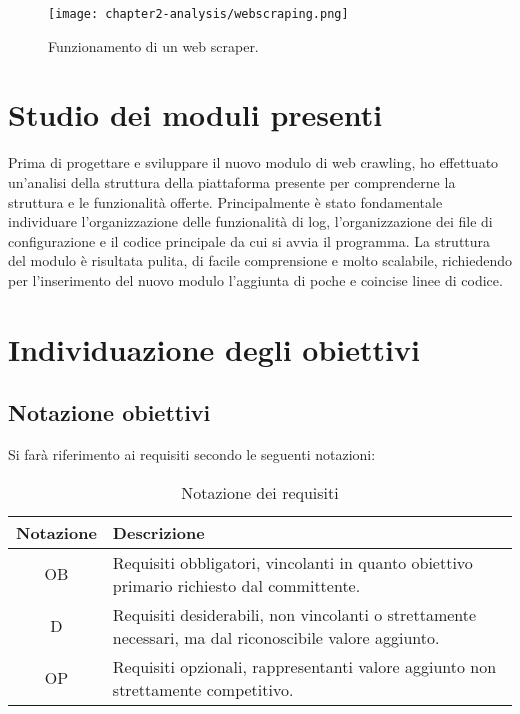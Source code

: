 \begin{figure}[!h] 
    \centering 
    \texttt{[image: chapter2-analysis/webscraping.png]} 
    \caption{Funzionamento di un web scraper.}
\end{figure}


\section{Studio dei moduli presenti}

Prima di progettare e sviluppare il nuovo modulo di web crawling, ho effettuato un’analisi della struttura della piattaforma presente per comprenderne la struttura e le funzionalità offerte. Principalmente è stato fondamentale individuare l'organizzazione delle funzionalità di log, l'organizzazione dei file di configurazione e il codice principale da cui si avvia il programma. La struttura del modulo è risultata pulita, di facile comprensione e molto scalabile, richiedendo per l'inserimento del nuovo modulo l'aggiunta di poche e coincise linee di codice.


\section{Individuazione degli obiettivi}

\subsection{Notazione obiettivi}
Si farà riferimento ai requisiti secondo le seguenti notazioni:
\begin{table}[!htbp]
  \centering
    \begin{tabularx}{\textwidth}{cX}
    \toprule
    \textbf{Notazione}	&	\textbf{Descrizione} \\
    \midrule
    OB			&	Requisiti obbligatori, vincolanti in quanto obiettivo primario richiesto dal committente. \\  
	\hline
    D			&	Requisiti desiderabili, non vincolanti o strettamente necessari, ma dal riconoscibile valore aggiunto. \\ 
	\hline
    OP			&	Requisiti opzionali, rappresentanti valore aggiunto non strettamente competitivo. \\
    \bottomrule
    \end{tabularx}%
  \label{tab:notazione-requisiti}%
  \caption{Notazione dei requisiti}
\end{table}%


